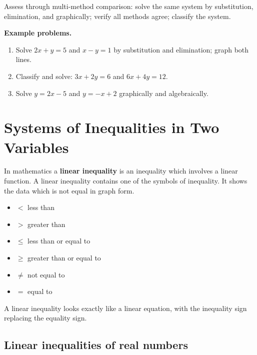 Assess through multi-method comparison: solve the same system by
substitution, elimination, and graphically; verify all methods agree;
classify the system.

\textbf{Example problems.}
\begin{enumerate}
    \item Solve $2x+y=5$ and $x-y=1$ by substitution and elimination;
          graph both lines.
    \item Classify and solve: $3x+2y=6$ and $6x+4y=12$.
    \item Solve $y=2x-5$ and $y=-x+2$ graphically and algebraically.
\end{enumerate}



\section{Systems of Inequalities in Two Variables}
\label{sec:syst-75e3}


In mathematics a \textbf{linear inequality} is an inequality which involves a linear
function. A linear inequality contains one of the symbols of inequality. It shows the data
which is not equal in graph form.



\begin{itemize}
    \item $<$ less than
    \item $>$ greater than
    \item $\leq$ less than or equal to
    \item $\geq$ greater than or equal to
    \item $\neq$ not equal to
    \item $=$ equal to
\end{itemize}

A linear inequality looks exactly like a linear equation, with the inequality sign
replacing the equality sign.




\subsection{Linear inequalities of real numbers}
\label{sss:line-7e04}





